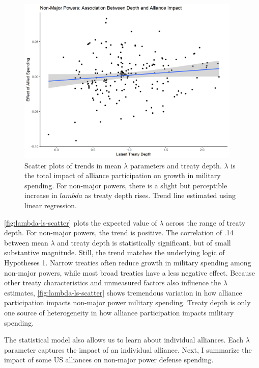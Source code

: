 \documentclass[12pt]{article}
\begin{document}
\begin{figure}[htbp]
	\centering
		\includegraphics[width=0.95\textwidth]{../figures/lambda-ld-nonmaj.png}
	\caption{Scatter plots of trends in mean $\lambda$ parameters and treaty depth. $\lambda$ is the total impact of alliance participation on growth in military spending. For non-major powers, there is a slight but perceptible increase in $lambda$ as treaty depth rises. Trend line estimated using linear regression.}
	\label{fig:lambda-ls-scatter}
\end{figure}


\autoref{fig:lambda-ls-scatter} plots the expected value of $\lambda$ across the range of treaty depth. 
For non-major powers, the trend is positive.
The correlation of .14 between mean $\lambda$ and treaty depth is statistically significant, but of small substantive magnitude. 
Still, the trend matches the underlying logic of Hypotheses 1. 
Narrow treaties often reduce growth in military spending among non-major powers, while most broad treaties have a less negative effect. 
Because other treaty characteristics and unmeasured factors also influence the $\lambda$ estimates, \autoref{fig:lambda-ls-scatter} shows tremendous variation in how alliance participation impacts non-major power military spending. 
Treaty depth is only one source of heterogeneity in how alliance participation impacts military spending. 


The statistical model also allows us to learn about individual alliances. 
Each $\lambda$ parameter captures the impact of an individual alliance. 
Next, I summarize the impact of some US alliances on non-major power defense spending. 
\end{document}
